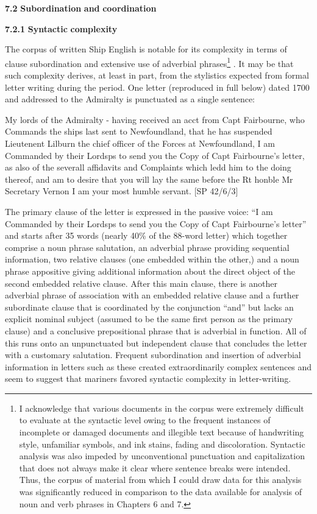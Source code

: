 \textbf{7.2} \textbf{Subordination} \textbf{and} \textbf{coordination}

  \textbf{7.2.1} \textbf{Syntactic} \textbf{complexity}

  The corpus of written Ship English is notable for its complexity in terms of clause subordination and extensive use of adverbial phrases\footnote{I acknowledge that various documents in the corpus were extremely difficult to evaluate at the syntactic level owing to the frequent instances of incomplete or damaged documents and illegible text because of handwriting style, unfamiliar symbols, and ink stains, fading and discoloration. Syntactic analysis was also impeded by unconventional punctuation and capitalization that does not always make it clear where sentence breaks were intended. Thus, the corpus of material from which I could draw data for this analysis was significantly reduced in comparison to the data available for analysis of noun and verb phrases in Chapters 6 and 7.} . It may be that such complexity derives, at least in part, from the stylistics expected from formal letter writing during the period. One letter (reproduced in full below) dated 1700 and addressed to the Admiralty is punctuated as a single sentence: 

My lords of the Admiralty - having received an acct from Capt Fairbourne, who Commands the ships last sent to Newfoundland, that he has suspended Lieutenent Lilburn the chief officer of the Forces at Newfoundland, I am Commanded by their Lordsps to send you the Copy of Capt Fairbourne’s letter, as also of the severall affidavits and Complaints which ledd him to the doing thereof, and am to desire that you will lay the same before the Rt honble Mr Secretary Vernon I am your most humble servant. [SP 42/6/3] 

The primary clause of the letter is expressed in the passive voice: “I am Commanded by their Lordsps to send you the Copy of Capt Fairbourne’s letter” and starts after 35 words (nearly 40\% of the 88-word letter) which together comprise a noun phrase salutation, an adverbial phrase providing sequential information, two relative clauses (one embedded within the other,) and a noun phrase appositive giving additional information about the direct object of the second embedded relative clause. After this main clause, there is another adverbial phrase of association with an embedded relative clause and a further subordinate clause that is coordinated by the conjunction “and” but lacks an explicit nominal subject (assumed to be the same first person as the primary clause) and a conclusive prepositional phrase that is adverbial in function. All of this runs onto an unpunctuated but independent clause that concludes the letter with a customary salutation. Frequent subordination and insertion of adverbial information in letters such as these created extraordinarily complex sentences and seem to suggest that mariners favored syntactic complexity in letter-writing.  

